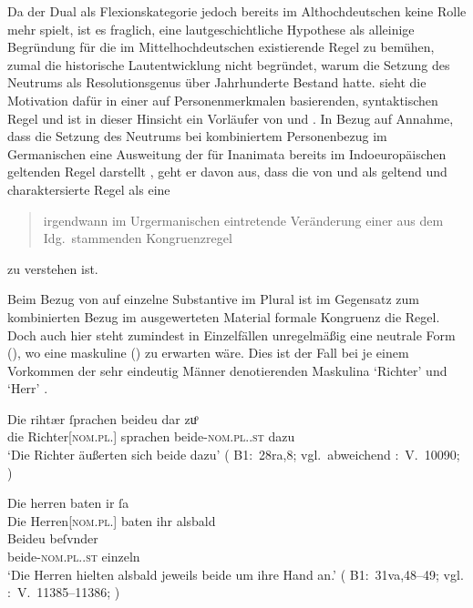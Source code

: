Da der Dual als Flexionskategorie jedoch bereits im
Althochdeutschen keine Rolle mehr spielt, ist es fraglich,
eine lautgeschichtliche Hypothese als alleinige Begründung für die im
Mittel\-hoch\-deutschen existierende Regel zu bemühen, zumal die historische
Lautentwicklung nicht begründet, warum die Setzung des Neutrums als
Resolutionsgenus über Jahrhunderte Bestand hatte. \citet{askedal1973} sieht die
Motivation dafür in einer auf Personenmerkmalen basierenden, syntaktischen
Regel und ist in dieser Hinsicht ein Vorläufer von \citet{corbett1983} und
\citet{wechslerzlatic2003}. In Bezug auf 
Annahme, dass die Setzung des Neutrums bei kombiniertem Personenbezug im
Germanischen eine Ausweitung der für Inanimata bereits im Indoeuropäischen
geltenden Regel darstellt \autocite[vgl.~auch][156--157]{hock2008}, geht er
davon aus, dass die von \citet[28]{behaghel1928} und \citet[188]{dal2014} als
 geltend und  charaktersierte
Regel als eine \blockcquote[15]{askedal1973}{irgendwann im Urgermanischen
eintretende\textdel{} Veränderung einer aus dem Idg.\ stammenden
Kongruenzregel} zu verstehen ist.

Beim Bezug von  auf einzelne Substantive im Plural ist im
Gegensatz zum kombinierten Bezug im ausgewerteten Material formale Kongruenz
die Regel. Doch auch hier steht zumindest in Einzelfällen unregelmäßig eine
neutrale Form (), wo eine maskuline () zu erwarten
wäre. Dies ist der Fall bei je einem Vorkommen der sehr eindeutig Männer
denotierenden Maskulina  `Richter' und 
`Herr' .

\begin{exe}
\ex \label{ex:richtherriu3}
	\begin{xlist}
	\ex \gll Die rihtær ſprachen beideu {dar zuͦ} \\
			die Richter[\textsc{nom.pl.\MascM}] sprachen
				beide-\textsc{nom.pl.\NeutM.st} dazu \\
		\trans `Die Richter äußerten sich beide dazu'
			(%
				B1:~28ra,8; vgl.~abweichend
				\KC:~V.~10090;
				\cite[267]{schroeder1895}%
			)
		\label{ex:richtherriu3_1}

	\ex \gll Die herren baten ir ſa \\
			Die Herren[\textsc{nom.pl.\MascM}] baten ihr alsbald \\
	\sn \gll Beideu beſvnder \\
			beide-\textsc{nom.pl.\NeutM.st} einzeln \\
		\trans `Die Herren hielten alsbald jeweils beide um ihre Hand an.'
			(%
				B1:~31va,48--49; vgl.
				\KC:~V.~11385--11386;
				\cite[289]{schroeder1895}%
			)
		\label{ex:richtherriu3_2}
	\end{xlist}
\end{exe}

